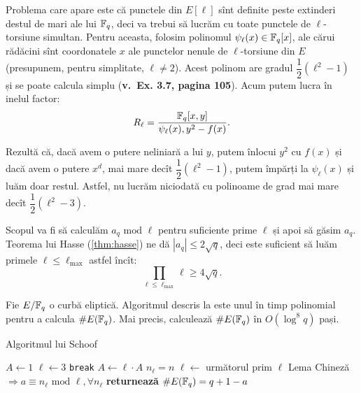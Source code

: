 Problema care apare este că punctele din $ E[\ell] $ sînt definite
peste extinderi destul de mari ale lui $ \mathbb{F}_q $, deci va trebui
să lucrăm cu toate punctele de $ \ell $-torsiune simultan. Pentru aceasta,
folosim polinomul $ \psi_\ell(x) \in \mathbb{F}_q[x] $, ale cărui rădăcini
sînt coordonatele $ x $ ale punctelor nenule de $ \ell $-torsiune
din $ E $ (presupunem, pentru simplitate, $ \ell \neq 2 $). Acest
polinom are gradul $ \dfrac{1}{2}(\ell^2 - 1) $ și se poate calcula
simplu ({\color{red}\textbf{v.\ Ex. 3.7, pagina 105}}). Acum putem lucra
în inelul factor:
\[
    R_\ell = \dfrac{\mathbb{F}_q[x, y]}{\psi_\ell(x), y^2 - f(x)}.
\]

Rezultă că, dacă avem o putere neliniară a lui $ y $, putem înlocui
$ y^2 $ cu $ f(x) $ și dacă avem o putere $ x^d $, mai mare decît
$ \dfrac{1}{2}(\ell^2 - 1) $, putem împărți la $ \psi_\ell(x) $ și luăm
doar restul. Astfel, nu lucrăm niciodată cu polinoame de grad mai mare
decît $ \dfrac{1}{2}(\ell^2 - 3) $.

Scopul va fi să calculăm $ a_q \text{ mod } \ell $ pentru suficiente
prime $ \ell $ și apoi să găsim $ a_q $. Teorema lui Hasse (\ref{thm:hasse})
ne dă $ |a_q| \leq 2 \sqrt{q} $, deci este suficient să luăm primele
$ \ell \leq \ell_{\max} $ astfel încît:
\[
    \prod_{\ell \leq \ell_{\max}} \ell \geq 4 \sqrt{q}.
\]

\begin{theorem}\label{thm:schoof}
   Fie $ E/\mathbb{F}_q $ o curbă eliptică. Algoritmul descris la  este
   unul în timp polinomial pentru a calcula $ \# E(\mathbb{F}_q) $. Mai precis,
   calculează $ \# E(\mathbb{F}_q) $ în $ O(\log^8 q) $ pași.
\end{theorem}

\begin{algorithm}
  \caption{Algoritmul lui Schoof}
  \label{alg:schoof}
  \begin{algorithmic}[1]
      \State $ A \gets 1 $
      \State $ \ell \gets 3 $
            \texttt{break}
          \EndIf
        \EndWhile
        \State $ A \gets \ell \cdot A $
        \State $ n_\ell = n $
        \State $ \ell \gets $ următorul prim $ \ell $
      \EndWhile
      \State Lema Chineză $ \Rightarrow a \equiv n_\ell \text{ mod } \ell, \forall n_\ell $
      \State \textbf{returnează} $ \# E(\mathbb{F}_q) = q + 1 - a $
    \EndProcedure
  \end{algorithmic}
\end{algorithm}


